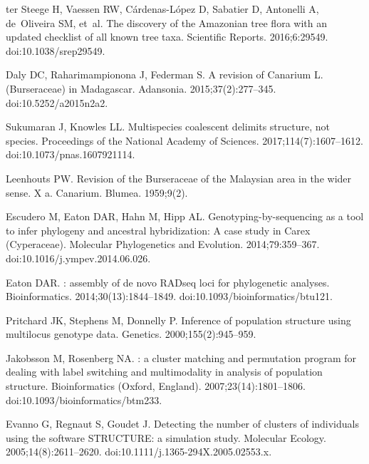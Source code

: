 \documentclass[10pt,letterpaper]{article}
\begin{document}
\begin{thebibliography}{10}
  ter Steege H, Vaessen RW, Cárdenas-López D, Sabatier D, Antonelli A,
  de~Oliveira SM, et~al.
  \newblock The discovery of the {Amazonian} tree flora with an updated checklist of all known tree taxa.
  \newblock Scientific Reports. 2016;6:29549.
  \newblock doi:{10.1038/srep29549}.

  Daly DC, Raharimampionona J, Federman S.
  \newblock A revision of {Canarium} {L}. ({Burseraceae}) in {Madagascar}.
  \newblock Adansonia. 2015;37(2):277--345.
  \newblock doi:{10.5252/a2015n2a2}.

  Sukumaran J, Knowles LL.
  \newblock Multispecies coalescent delimits structure, not species.
  \newblock Proceedings of the National Academy of Sciences.
  2017;114(7):1607--1612.
  \newblock doi:{10.1073/pnas.1607921114}.

  Leenhouts PW.
  \newblock Revision of the {Burseraceae} of the {Malaysian} area in the wider
  sense. {X} a. {Canarium}.
  \newblock Blumea. 1959;9(2).

  Escudero M, Eaton DAR, Hahn M, Hipp AL.
  \newblock Genotyping-by-sequencing as a tool to infer phylogeny and ancestral
  hybridization: {A} case study in {Carex} ({Cyperaceae}).
  \newblock Molecular Phylogenetics and Evolution. 2014;79:359--367.
  \newblock doi:{10.1016/j.ympev.2014.06.026}.

  Eaton DAR.
  : assembly of de novo {RADseq} loci for phylogenetic analyses.
  \newblock Bioinformatics. 2014;30(13):1844--1849.
  \newblock doi:{10.1093/bioinformatics/btu121}.

  Pritchard JK, Stephens M, Donnelly P.
  \newblock Inference of population structure using multilocus genotype data.
  \newblock Genetics. 2000;155(2):945--959.

  Jakobsson M, Rosenberg NA.
  : a cluster matching and permutation program for dealing with label switching and multimodality in analysis of population structure.
  \newblock Bioinformatics (Oxford, England). 2007;23(14):1801--1806.
  \newblock doi:{10.1093/bioinformatics/btm233}.

  Evanno G, Regnaut S, Goudet J.
  \newblock Detecting the number of clusters of individuals using the software
  {STRUCTURE}: a simulation study.
  \newblock Molecular Ecology. 2005;14(8):2611--2620.
  \newblock doi:{10.1111/j.1365-294X.2005.02553.x}.


\end{thebibliography}
\end{document}
